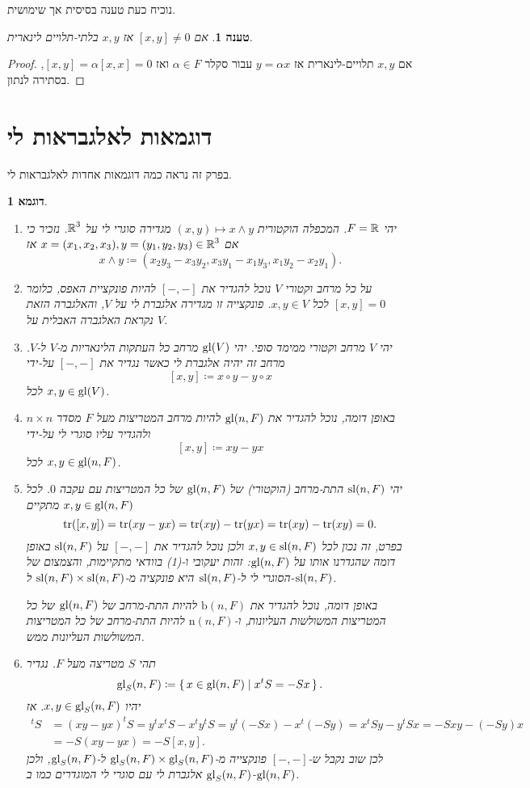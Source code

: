 \documentclass{report}
\theoremstyle{break}
\newtheorem{preposition}[preposition]{טענה}
\newtheorem{example}[example]{דוגמא}
\theoremstyle{MyNonumberbreak}
\newtheorem{proof}{הוכחה}
\begin{document}
	נוכיח כעת טענה בסיסית אך שימושית.
\begin{preposition} \label{prep:linear-independence}
	אם $[x, y] \neq 0$ אז $x, y$ בלתי-תלויים לינארית.
\end{preposition}
\begin{proof}
	אם $x, y$ תלויים-לינארית אז $y = \alpha x$ עבור סקלר $\alpha \in F$ ואז $[x, y] = \alpha [x, x] = 0$, בסתירה לנתון.
\end{proof}

\section{דוגמאות לאלגבראות לי} \label{sec:exaLie}
בפרק זה נראה כמה דוגמאות אחדות לאלגבראות לי.
\begin{example} \label{exa:Lie}
	\begin{enumerate}[label=(\alph*)]
	\item 
	יהי $F = \operatorname{\mathbb{R}}$. המכפלה הוקטורית $(x, y) \mapsto x \wedge y$ מגדירה סוגרי לי על $\operatorname{\mathbb{R}}^3$. נזכיר כי אם $x = (x_1, x_2, x_3), y = (y_1, y_2, y_3) \in \operatorname{\mathbb{R}}^3$ אז
	\[ x \wedge y \coloneqq (x_2y_3 - x_3y_2, x_3y_1 - x_1y_3, x_1y_2 - x_2y_1). \]
	\item
	על כל מרחב וקטורי $V$ נוכל להגדיר את $[-, -]$ להיות פונקציית האפס, כלומר $[x, y] = 0$ לכל $x, y \in V$. פונקצייה זו מגדירה אלגברת לי על $V$, והאלגברה הזאת נקראת האלגברה \textit{האבלית} על $V$.
	\item
	יהי $V$ מרחב וקטורי ממימד סופי. יהי $\operatorname{gl}(V)$ מרחב כל העתקות הלינאריות מ-$V$ ל-$V$. מרחב זה יהיה אלגברת לי כאשר נגדיר את $[-, -]$ על-ידי
	\[ [x, y] \coloneqq x \circ y - y \circ x \]
	לכל $x, y \in \operatorname{gl}(V)$.
	\item
		באופן דומה, נוכל להגדיר את $\operatorname{gl}(n, F)$ להיות מרחב המטריצות מעל $F$ מסדר $n \times n$ ולהגדיר עליו סוגרי לי על-ידי
	\[ [x, y] \coloneqq xy - yx \]
	לכל $x, y \in \operatorname{gl}(n, F)$.
	\item
		יהי $\operatorname{sl}(n, F)$ התת-מרחב (הוקטורי) של $\operatorname{gl}(n, F)$ של כל המטריצות עם עקבה $0$. לכל $x, y \in \operatorname{gl}(n, F)$ מתקיים 
	\[ \operatorname{tr}([x, y]) = \operatorname{tr}(xy - yx) = \operatorname{tr}(xy) - \operatorname{tr}(yx) = \operatorname{tr}(xy) - \operatorname{tr}(xy) = 0. \]
	בפרט, זה נכון לכל $x, y \in \operatorname{sl}(n, F)$ ולכן נוכל להגדיר את $[-, -]$ על $\operatorname{sl}(n, F)$ באופן דומה שהגדרנו אותו על $\operatorname{gl}(n, F)$: זהות יעקובי ו-(1) בוודאי מתקיימות, והצמצום של הסוגרי לי ל-$\operatorname{sl}(n, F)$ היא פונקציה מ-$\operatorname{sl}(n, F) \times \operatorname{sl}(n, F)$ ל-$\operatorname{sl}(n, F)$.
	
	באופן דומה, נוכל להגדיר את $\mathrm{b}(n, F)$ להיות התת-מרחב של $\operatorname{gl}(n, F)$ של כל המטריצות המשולשות העליונות, ו-$\mathrm{n}(n, F)$ להיות התת-מרחב של כל המטריצות המשולשות העליונות ממש.
		\item
		תהי $S$ מטריצה מעל $F$. נגדיר
	\[ \operatorname{gl}_S(n, F) \coloneqq \set{x \in \operatorname{gl}(n, F) | x^tS = -Sx}. \]
	יהיו $x, y \in \operatorname{gl}_S(n, F)$. אז
	\begin{align*}
	[x, y]^tS &= (xy - yx)^tS = y^tx^tS - x^ty^tS = y^t(-Sx) - x^t(-Sy) = x^tSy - y^tSx = -Sxy - (-Sy)x \\
		&= -S(xy - yx) = -S[x, y].
\end{align*}
	לכן שוב נקבל ש-$[-, -]$ פונקצייה מ-$\operatorname{gl}_S(n, F) \times \operatorname{gl}_S(n, F)$ ל-$\operatorname{gl}_S(n, F)$, ולכן $\operatorname{gl}_S(n, F)$ אלגברת לי עם סוגרי לי המוגדרים כמו ב-$\operatorname{gl}(n, F)$.	
\end{enumerate}
\end{example}
\end{document}
